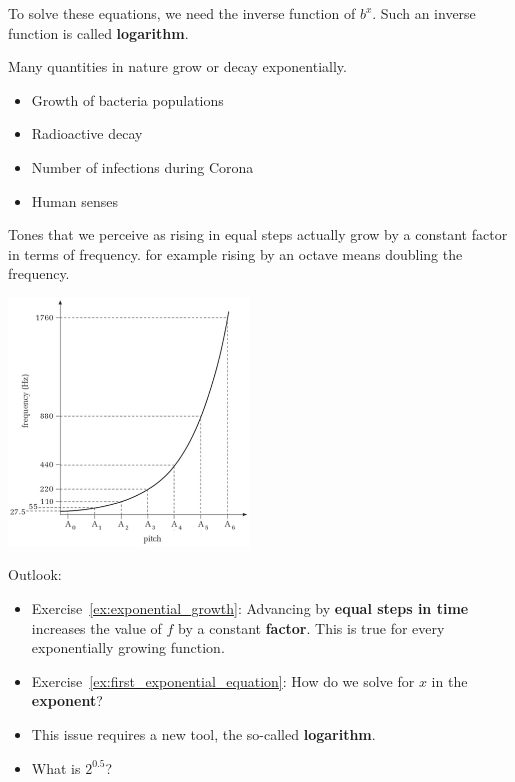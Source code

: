 To solve these equations, we need the inverse function of $b^x$.
Such an inverse function is called \textbf{logarithm}.
\begin{tcolorbox}
	Many quantities in nature grow or decay exponentially.
	\begin{itemize}
		\item Growth of bacteria populations
		\item Radioactive decay
		\item Number of infections during Corona
		\item Human senses %
	\end{itemize}
\end{tcolorbox}
\begin{example}
	Tones that we perceive as rising in equal steps actually grow by a constant factor in terms of frequency.
	for example rising by an octave means doubling the frequency.
	\begin{center}
	\includegraphics[width=0.48\textwidth]{images/octave}
	\end{center}
\end{example}
\begin{tcolorbox}
	Outlook:
	\begin{itemize}
		\item Exercise~\ref{ex:exponential_growth}: Advancing by \textbf{equal steps in time} increases the value of $f$ by a constant \textbf{factor}.
		This is true for every exponentially growing function.
		\item Exercise~\ref{ex:first_exponential_equation}: How do we solve for $x$ in the \textbf{exponent}?
		\item This issue requires a new tool, the so-called \textbf{logarithm}.
		\item What is $2^{0.5}$?
	\end{itemize}
\end{tcolorbox}
